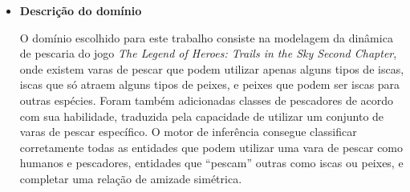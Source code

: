 \documentclass{../../sftex/sftex}
\begin{document}
\begin{itemize}
    \item \textbf{Descrição do domínio}

        O domínio escolhido para este trabalho consiste na modelagem da
        dinâmica de pescaria do jogo \emph{The Legend of Heroes: Trails in the
        Sky Second Chapter}, onde existem varas de pescar que podem utilizar
        apenas alguns tipos de iscas, iscas que só atraem alguns tipos de
        peixes, e peixes que podem ser iscas para outras espécies. Foram
        também adicionadas classes de pescadores de acordo com sua habilidade,
        traduzida pela capacidade de utilizar um conjunto de varas de pescar
        específico. O motor de inferência consegue classificar corretamente
        todas as entidades que podem utilizar uma vara de pescar como humanos
        e pescadores, entidades que ``pescam'' outras como iscas ou peixes,
        e completar uma relação de amizade simétrica.

\end{itemize}



\end{document}
